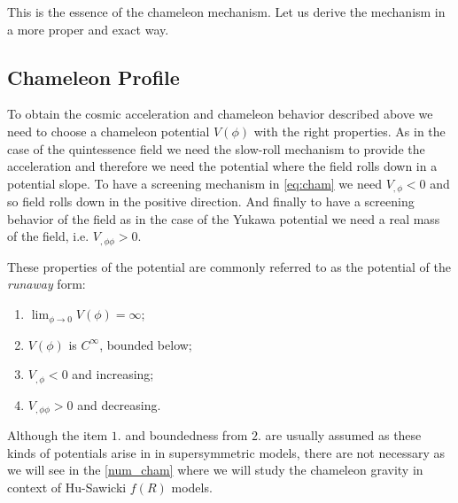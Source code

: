 This is the essence of the chameleon mechanism. Let us derive the mechanism in a more proper and exact way.
\subsection{Chameleon Profile}
\label{cham_prof}
To obtain the cosmic acceleration and chameleon behavior described above we need to choose a chameleon potential $V(\phi)$ with the right properties. As in the case of the quintessence field we need the slow-roll mechanism to provide the acceleration and therefore we need the potential where the field rolls down in a potential slope. To have a screening mechanism in \eqref{eq:cham} we need $V_{,\phi}<0$ and so field rolls down in the positive direction. And finally to have a screening behavior of the field as in  the case of the Yukawa potential we need a real mass of the field, i.e. $V_{,\phi\phi}>0$.

These properties of the potential are commonly referred to as the potential of the \textit{runaway} form:
\begin{enumerate}
	\item $\lim_{\phi \to 0}V\left(\phi\right)=\infty$;
	\item $V\left(\phi\right)$ is $C^\infty$, bounded below;
	\item $V_{,\phi}<0$ and increasing;
	\item $V_{,\phi\phi}>0$ and decreasing.
\end{enumerate}
Although the item $1.$ and boundedness from $2.$ are usually assumed as these kinds of potentials arise in in supersymmetric models, there are not necessary as we will see in the \autoref{num_cham} where we will study the chameleon gravity in context of Hu-Sawicki $f(R)$ models.


